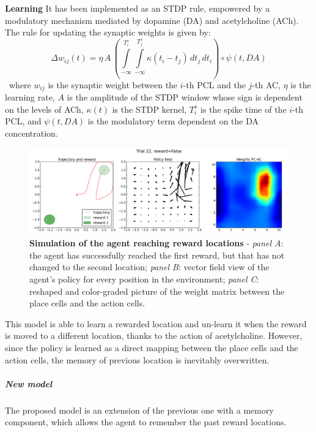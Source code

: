 \noindent\textbf{Learning}
\hfill\break
\noindent It has been implemented as an STDP rule, empowered by a modulatory mechanism mediated by dopamine (DA) and acetylcholine (ACh). The rule for updating the synaptic weights is given by:
\begin{equation}
    \Delta w_{ij}(t)=\eta\,A\,\left(\int\limits_{-\infty}^{T^s_i}\int\limits_{-\infty}^{T^s_j}\kappa(t_i-t_j)\,dt_j\,dt_i\right)\circ \psi(t, DA)
\end{equation}\
where $w_{ij}$ is the synaptic weight between the $i$-th PCL and the $j$-th AC, $\eta$ is the learning rate, $A$ is the amplitude of the STDP window whose sign is dependent on the levels of ACh, $\kappa(t)$ is the STDP kernel, $T^s_i$ is the spike time of the $i$-th PCL, and $\psi(t, DA)$ is the
modulatory term dependent on the DA concentration.


\begin{figure}[ht]
    \centering
    \includegraphics[scale=0.07]{figures/model_brzosko_1.png} 
    \caption{\textbf{Simulation of the agent reaching reward locations} - \textit{panel A}: the agent has successfully reached the first reward, but that has not changed to the second location; \textit{panel B}: vector field view of the agent's policy for every position in the environment;
    \textit{panel C}: reshaped and color-graded picture of the weight matrix between the place cells and the action cells.}
    \label{fig:model_1}
\end{figure}

\vspace{0.25cm}
\noindent
This model is able to learn a rewarded location and un-learn it when the reward is moved to a different location, thanks to the action of acetylcholine. However, since the policy is learned as a direct mapping between the place cells and the action cells, the memory of previous location is
inevitably overwritten. 

\subparagraph{New model}
\hfill \break
\noindent The proposed model is an extension of the previous one with a memory component, which allows the agent to remember the past reward locations.  

